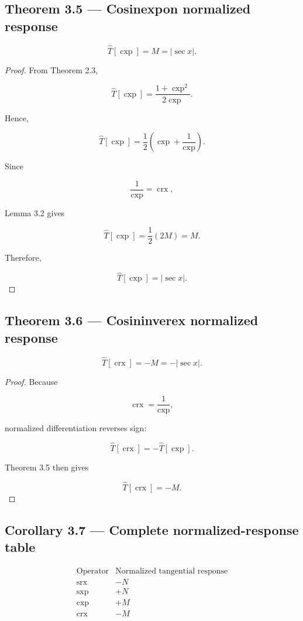 \documentclass[11pt,oneside,openany]{book}
\newcommand{\PCsubsection}[1]{%
  \subsection*{#1}%
}
\begin{document}
\PCsubsection{Theorem 3.5 --- Cosinexpon normalized response}

\[
\boxed{ \widehat T[\operatorname{cxp}] = M = |\sec x| }.
\]

\begin{proof}
From Theorem 2.3,

\[
\widehat T[\operatorname{cxp}] = \frac{1+\operatorname{cxp}^2} {2\operatorname{cxp}}.
\]

Hence,

\[
\widehat T[\operatorname{cxp}] = \frac12 \left( \operatorname{cxp} + \frac1{\operatorname{cxp}} \right).
\]

Since

\[
\frac1{\operatorname{cxp}} = \operatorname{crx},
\]

Lemma 3.2 gives

\[
\widehat T[\operatorname{cxp}] = \frac12(2M) = M.
\]

Therefore,

\[
\boxed{ \widehat T[\operatorname{cxp}] = |\sec x| }.
\]

\end{proof}

\PCsubsection{Theorem 3.6 --- Cosininverex normalized response}

\[
\boxed{ \widehat T[\operatorname{crx}] = -M = -|\sec x| }.
\]

\begin{proof}
Because

\[
\operatorname{crx} = \frac1{\operatorname{cxp}},
\]

normalized differentiation reverses sign:

\[
\widehat T[\operatorname{crx}] = -\widehat T[\operatorname{cxp}].
\]

Theorem 3.5 then gives

\[
\widehat T[\operatorname{crx}] = -M.
\]

\end{proof}

\PCsubsection{Corollary 3.7 --- Complete normalized-response table}

\[
\boxed{ \begin{array}{c|c} \text{Operator} & \text{Normalized tangential response} \\ \hline \operatorname{srx} & -N \\ \operatorname{sxp} & +N \\ \operatorname{cxp} & +M \\ \operatorname{crx} & -M \end{array} }
\]
\end{document}
